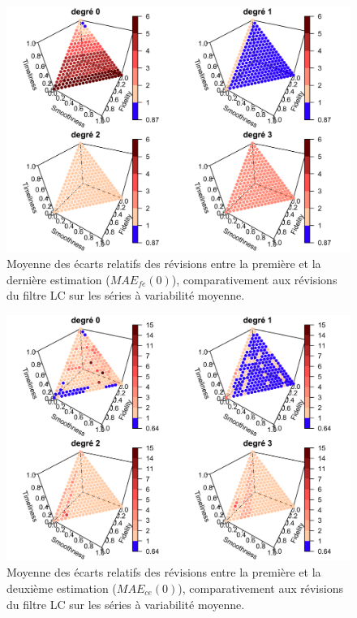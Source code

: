 \documentclass[
  12pt,
  a4paper,french]{article}
\newcommand\1{\mathds{1}}
\begin{document}
\begin{figure}

{\centering \includegraphics[width=0.9\linewidth]{img/simulations/fst_mediumvariability_fe_q0} 

}

\caption[Moyenne des écarts relatifs des révisions entre la première et la dernière estimation (\(MAE_{fe}(0)\)), comparativement aux révisions du filtre LC sur les séries à variabilité moyenne]{Moyenne des écarts relatifs des révisions entre la première et la dernière estimation (\(MAE_{fe}(0)\)), comparativement aux révisions du filtre LC sur les séries à variabilité moyenne.}\label{fig:graphsfeq0simulfst}

\footnotesize
\normalsize\end{figure}

\begin{figure}

{\centering \includegraphics[width=0.9\linewidth]{img/simulations/fst_mediumvariability_ceq0} 

}

\caption[Moyenne des écarts relatifs des révisions entre la première et la deuxième estimation (\(MAE_{ce}(0)\)), comparativement aux révisions du filtre LC sur les séries à variabilité moyenne]{Moyenne des écarts relatifs des révisions entre la première et la deuxième estimation (\(MAE_{ce}(0)\)), comparativement aux révisions du filtre LC sur les séries à variabilité moyenne.}\label{fig:graphsceq0simulfst}

\footnotesize
\normalsize\end{figure}
\end{document}
